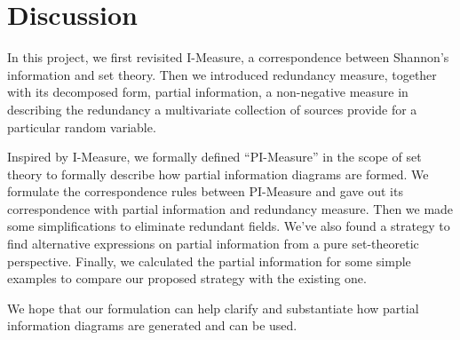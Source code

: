 \section{Discussion}

In this project, we first revisited I-Measure, a correspondence between Shannon's information and set theory. Then we introduced redundancy measure, together with its decomposed form, partial information, a non-negative measure in describing the redundancy a multivariate collection of sources provide for a particular random variable.

Inspired by I-Measure, we formally defined ``PI-Measure'' in the scope of set theory to formally describe how partial information diagrams are formed. We formulate the correspondence rules between PI-Measure and gave out its correspondence with partial information and redundancy measure. Then we made some simplifications to eliminate redundant fields. We've also found a strategy to find alternative expressions on partial information from a pure set-theoretic perspective. Finally, we calculated the partial information for some simple examples to compare our proposed strategy with the existing one.

We hope that our formulation can help clarify and substantiate how partial information diagrams are generated and can be used.
